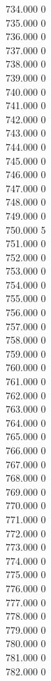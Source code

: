 { 734.000	0 \\
 735.000	0 \\
 736.000	0 \\
 737.000	0 \\
 738.000	0 \\
 739.000	0 \\
 740.000	0 \\
 741.000	0 \\
 742.000	0 \\
 743.000	0 \\
 744.000	0 \\
 745.000	0 \\
 746.000	0 \\
 747.000	0 \\
 748.000	0 \\
 749.000	0 \\
 750.000	5 \\
 751.000	0 \\
 752.000	0 \\
 753.000	0 \\
 754.000	0 \\
 755.000	0 \\
 756.000	0 \\
 757.000	0 \\
 758.000	0 \\
 759.000	0 \\
 760.000	0 \\
 761.000	0 \\
 762.000	0 \\
 763.000	0 \\
 764.000	0 \\
 765.000	0 \\
 766.000	0 \\
 767.000	0 \\
 768.000	0 \\
 769.000	0 \\
 770.000	0 \\
 771.000	0 \\
 772.000	0 \\
 773.000	0 \\
 774.000	0 \\
 775.000	0 \\
 776.000	0 \\
 777.000	0 \\
 778.000	0 \\
 779.000	0 \\
 780.000	0 \\
 781.000	0 \\
 782.000	0 \\
}
